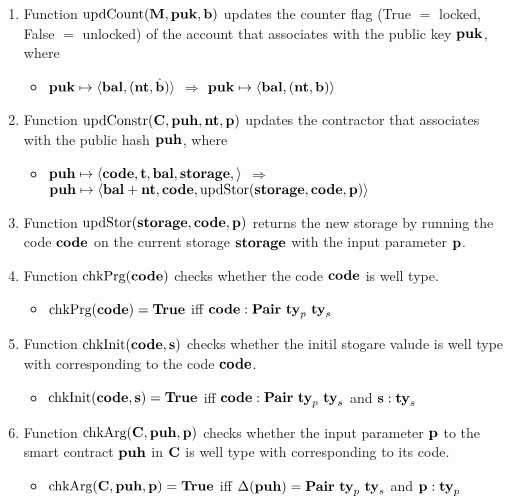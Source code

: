 \documentclass[a4paper]{llncs}
\begin{document}
\begin{enumerate}
    \item Function $\textup{updCount}(\textbf{M}, \textbf{puk}, \textbf{b})$ updates the counter flag (True $=$ locked, False $=$ unlocked) of the account that associates with the public key $\textbf{puk}$, where
    \begin{itemize}
        \item[]  $ \textbf{puk} \mapsto \langle \textbf{bal}, (\textbf{nt}, \hat{\textbf{b}}) \rangle $ $\Rightarrow$ $\textbf{puk} \mapsto \langle \textbf{bal}, (\textbf{nt}, \textbf{b}) \rangle $ 
    \end{itemize}
    
    \item Function  $\textup{updConstr} (\textbf{C}, \textbf{puh}, \textbf{nt}, \textbf{p})$ updates the contractor that associates with the public hash $\textbf{puh}$, where
    \begin{itemize}
        \item[] $\textbf{puh}  \mapsto \langle   \textbf{code}, \textbf{t}, \textbf{bal}, \textbf{storage}, \rangle $ $\Rightarrow$ $\textbf{puh}  \mapsto \langle  \textbf{bal} + \textbf{nt}, \textbf{code}, \\ \textup{updStor}(\textbf{storage},\textbf{code},\textbf{p}) \rangle $
    \end{itemize}
    
     \item Function $\textup{updStor}(\textbf{storage}, \textbf{code},  \textbf{p})$ returns the new storage by running the code $\textbf{code}$ on the  current storage  $\textbf{storage}$ with  the input parameter $\textbf{p}$.
    
    \item Function $\textup{chkPrg} (\textbf{code})$ checks whether the code $\textbf{code}$ is well type.
    
    \begin{itemize}
        \item[] $\textup{chkPrg} (\textbf{code}) = \textbf{True}$ iff $\CODE : \TPAIR\ \TYPE_p\ \TYPE_s$
    \end{itemize}
    \item Function $\textup{chkInit} (\textbf{code}, \textbf{s})$ checks whether the initil stogare valude is well type with corresponding to the code $\textbf{code}$.
    \begin{itemize}
        \item[] $\textup{chkInit} (\textbf{code}, \textbf{s}) = \textbf{True}$ iff $\CODE : \TPAIR\ \TYPE_p\ \TYPE_s$ and $\textbf{s} : \textbf{ty}_s$
    \end{itemize}
    
    \item Function $\textup{chkArg} (\textbf{C}, \textbf{puh}, \textbf{p})$ checks whether the input parameter  $\textbf{p}$ to the smart contract $\textbf{puh}$ in $\textbf{C}$ is well type with corresponding to its code.
    \begin{itemize}
        \item[] $\textup{chkArg} (\textbf{C}, \textbf{puh}, \textbf{p}) = \textbf{True}$ iff $\Delta (\textbf{puh}) =
  \textbf{Pair}\ \textbf{ty}_p\ \textbf{ty}_s$ and $\textbf{p} : \textbf{ty}_p$
    \end{itemize}
   

\end{enumerate}
\end{document}
